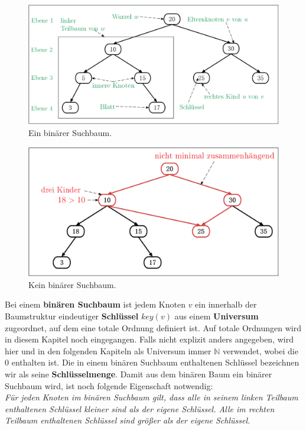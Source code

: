 \documentclass[a4paper,12pt]{article}
\begin{document}
\begin{figure}[H]
	\centering
	\includegraphics[width= 1\textwidth]{Medien/Einleitung/ioSuchbaum}
	\caption{Ein binärer Suchbaum. }
	\label{fig:ioSuchbaum}
\end{figure}
\begin{figure}[H]
	\centering
	\includegraphics[width= 1\textwidth]{Medien/Einleitung/nioSuchbaum}
	\caption{Kein binärer Suchbaum. }
	\label{fig:nioSuchbaum}
\end{figure}

\noindent Bei einem \textbf{binären Suchbaum} ist jedem Knoten $v$ ein innerhalb der Baumstruktur eindeutiger \textbf{Schlüssel} $\mathit{key}\left(v\right)$ aus einem \textbf{Universum} zugeordnet, auf dem eine totale Ordnung definiert ist. Auf totale Ordnungen wird in diesem Kapitel noch eingegangen. Falls nicht explizit anders angegeben, wird hier und in den folgenden Kapiteln als Universum immer $\mathbb{N}$ verwendet, wobei die $0$ enthalten ist. Die in einem binären Suchbaum enthaltenen Schlüssel bezeichnen wir als seine \textbf{Schlüsselmenge}.  Damit aus dem binären Baum ein binärer Suchbaum wird, ist noch folgende Eigenschaft notwendig:\\
\textit{Für jeden Knoten im binären Suchbaum gilt, dass alle in seinem linken Teilbaum enthaltenen Schlüssel kleiner sind als der eigene Schlüssel. Alle im rechten Teilbaum enthaltenen Schlüssel sind größer als der eigene Schlüssel.} \\
\end{document}
